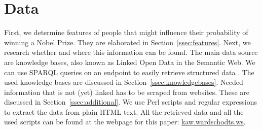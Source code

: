\section{Data}
\label{sec:data}

First, we determine features of people that might influence their probability of winning a Nobel Prize. They are elaborated in Section~\ref{ssec:features}. Next, we research whether and where this information can be found. The main data source are knowledge bases, also known as Linked Open Data in the Semantic Web. We can use SPARQL queries on an endpoint to easily retrieve structured data \cite{wc3SPARQL}. The used knowledge bases are discussed in Section~\ref{ssec:knowledgebases}. Needed information that is not (yet) linked has to be scraped from websites. These are discussed in Section~\ref{ssec:additional}. We use Perl scripts and regular expressions to extract the data from plain HTML text. All the retrieved data and all the used scripts can be found at the webpage for this paper: \url{kaw.wardschodts.ws}.

